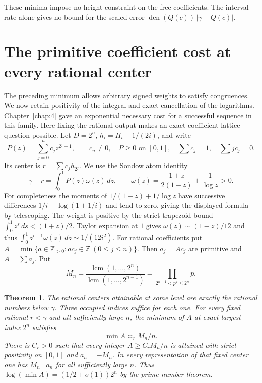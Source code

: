\documentclass[11pt,a4paper,oneside,openany]{report}
\newtheorem{theorem}{Theorem}[section]
\theoremstyle{remark}\newtheorem{remark}[theorem]{Remark}
\numberwithin{equation}{section}
\begin{document}
These minima impose no height constraint on the free coefficients.
The interval rate alone gives no bound for the scaled error
$\operatorname{den}(Q(c))\,|\gamma-Q(c)|$.
\section{The primitive coefficient cost at every rational center}
\label{ch5:dl:sec}
The preceding minimum allows arbitrary signed weights to satisfy congruences. We now retain positivity of the integral and exact cancellation of the logarithms. Chapter~\ref{chap:4} gave an exponential necessary cost for a successful sequence in this family. Here fixing the rational output makes an exact coefficient-lattice question possible.
Let $D=2^n$, $h_i=H_i-1/(2i)$, and write
\[
 P(z)=\sum_{j=0}^n c_j z^{2^j-1},\qquad
 c_n\ne0,\quad P\ge0\text{ on }[0,1],\quad
 \sum c_j=1,\quad \sum j c_j=0.
\]
Its center is $r=\sum c_jh_{2^j}$. We use the Sondow atom identity
\[
 \gamma-r=\int_0^1P(z)\omega(z)\,dz,\qquad
 \omega(z)=\frac{1+z}{2(1-z)}+\frac1{\log z}>0 .
\]
For completeness the moments of $1/(1-z)+1/\log z$ have successive
differences $1/i-\log(1+1/i)$ and tend to zero, giving the displayed
formula by telescoping. The weight is positive by the strict trapezoid
bound $\int_0^1 z^s\,ds<(1+z)/2$. Taylor expansion at $1$ gives
$\omega(z)\sim(1-z)/12$ and thus
$\int_0^1 z^{i-1}\omega(z)\,dz\sim1/(12i^2)$.
For rational coefficients put $A=\min\{a\in\mathbb Z_{>0}:ac_j\in
\mathbb Z\ (0\le j\le n)\}$. Then $a_j=A c_j$ are primitive and
$A=\sum a_j$. Put
\[
 M_n=\frac{\operatorname{lcm}(1,\ldots,2^n)}
 {\operatorname{lcm}(1,\ldots,2^{n-1})}
 =\prod_{2^{n-1}<p^k\le2^n}p .
\]
\begin{theorem}\label{ch5:dl:main}
The rational centers attainable at some level are exactly the rational
numbers below $\gamma$. Three occupied indices suffice for each one.
For every fixed rational $r<\gamma$ and all sufficiently large $n$, the
minimum of $A$ at exact largest index $2^n$ satisfies
\[
                  \min A\asymp_r M_n/n .
\]
There is $C_r>0$ such that every integer $A\ge C_r M_n/n$ is attained
with strict positivity on $[0,1]$ and $a_n=-M_n$.
In every representation of that fixed center
one has $M_n\mid a_n$ for all sufficiently large $n$.
Thus $\log(\min A)=(1/2+o(1))2^n$ by the prime number theorem.
\end{theorem}
\end{document}
